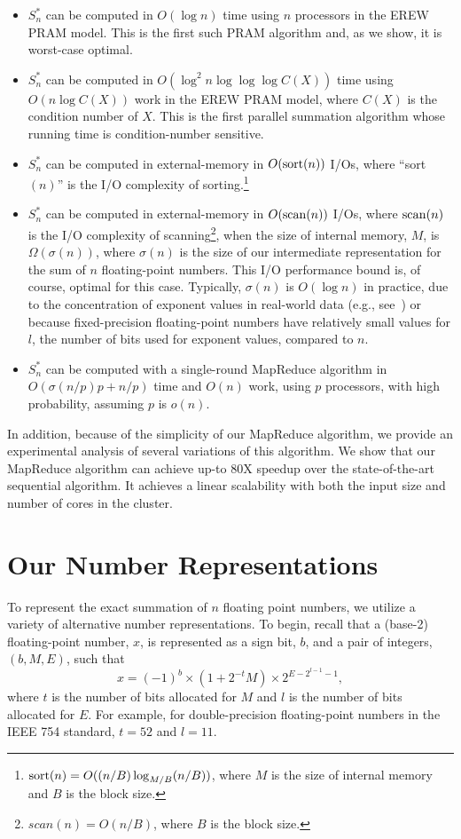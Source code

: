 \documentclass[11pt]{article}
\begin{document}
\begin{itemize}
\item
$S^*_n$ can be computed
in $O(\log n)$ time using $n$ processors in the EREW PRAM model.
This is the first such PRAM algorithm and, as we show, it is worst-case 
optimal.
\item
$S^*_n$ can be computed 
in $O(\log^2 n \log\log\log C(X))$ time using $O(n\log C(X))$ work 
in the EREW PRAM model, where $C(X)$ is the condition number of $X$.
This is the first parallel summation algorithm 
whose running time is condition-number sensitive.
\item
$S^*_n$ can be computed in external-memory
in $O({\rm sort}(n))$ I/Os, where ``sort$(n)$'' is the 
I/O complexity of sorting.\footnote{${\rm sort}(n)=O((n/B)\log_{M/B} (n/B))$,
  where $M$ is the size of internal memory and $B$ is the block size.}
\item
$S^*_n$ can be computed in external-memory
in $O({\rm scan}(n))$ I/Os, where ${\rm scan}(n)$ is 
the I/O complexity of scanning\footnote{${scan}(n)=O(n/B)$, where $B$ is 
   the block size.},
when the size of internal memory, $M$, is $\Omega(\sigma(n))$,
where $\sigma(n)$ is the size of our intermediate representation for 
the sum of $n$ floating-point numbers.
This I/O performance bound is, of course, optimal for this case.
Typically, $\sigma(n)$ is $O(\log n)$ in practice,
due to the concentration of exponent values in real-world data
(e.g., see~\cite{Isenburg2005869,LH230407}) 
or because fixed-precision floating-point
numbers have relatively small values for $l$, the number of bits used
for exponent values, compared to $n$.
\item
$S^*_n$ can be computed
with a single-round MapReduce algorithm in $O(\sigma(n/p)p+n/p)$ time
and $O(n)$ work, using $p$ processors, with high probability,
assuming $p$ is $o(n)$.
\end{itemize}
In addition, because of the simplicity of our MapReduce algorithm,
we provide an experimental analysis
of several variations of this algorithm.
We show that our MapReduce algorithm can achieve up-to 80X speedup
over the state-of-the-art sequential algorithm. It achieves a linear scalability
with both the input size and number of cores in the cluster.

\section{Our Number Representations}
To represent the exact summation of $n$ floating point numbers,
we utilize a variety of alternative number representations.
To begin,
recall that a (base-2) floating-point number, $x$, is represented as
a sign bit, $b$, and
a pair of integers, $(b,M,E)$, 
such that
\[
x = (-1)^b \times (1+ 2^{-t}M) \times 2^{E-2^{l-1}-1},
\]
where $t$ is the number of bits allocated for $M$ and $l$ is the 
number of bits allocated for $E$.
For example, for double-precision floating-point numbers in the IEEE 754
standard, $t=52$ and $l=11$.
\end{document}
